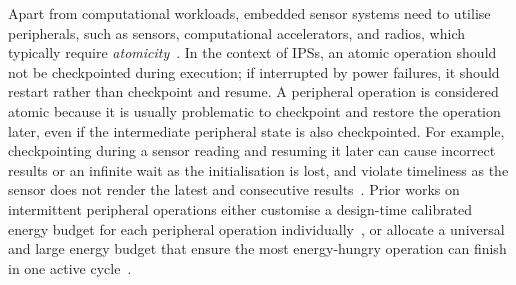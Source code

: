 




Apart from computational workloads, embedded sensor systems need to utilise peripherals, such as sensors, computational accelerators, and radios, which typically require \textit{atomicity}~\cite{berthou2020formal}.
In the context of IPSs, an atomic operation should not be checkpointed during execution; if interrupted by power failures, it should restart rather than checkpoint and resume.
A peripheral operation is considered atomic because it is usually problematic to checkpoint and restore the operation later, even if the intermediate peripheral state is also checkpointed.
For example, checkpointing during a sensor reading and resuming it later can cause incorrect results or an infinite wait as the initialisation is lost, and violate timeliness as the sensor does not render the latest and consecutive results~\cite{maeng2019supporting}. 
Prior works on intermittent peripheral operations either customise a design-time calibrated energy budget for each peripheral operation individually~\cite{gomez2016dynamic}, or allocate a universal and large energy budget that ensure the most energy-hungry operation can finish in one active cycle~\cite{maeng2019supporting}.


